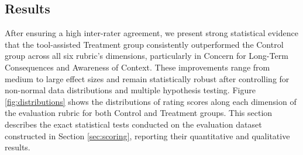 
\subsection{Results}

After ensuring a high inter-rater agreement, we present strong statistical evidence that
the tool-assisted Treatment group consistently outperformed the Control group across all six rubric's dimensions, particularly in Concern for Long-Term Consequences and Awareness of Context. These improvements range from medium to large effect sizes and remain statistically robust after controlling for non-normal data distributions and multiple hypothesis testing. Figure \ref{fig:distributions} shows the distributions of rating scores along each dimension of the evaluation rubric for both Control and Treatment groups. This section describes the exact statistical tests conducted on the evaluation dataset constructed in Section \ref{sec:scoring}, reporting their quantitative and qualitative results.

